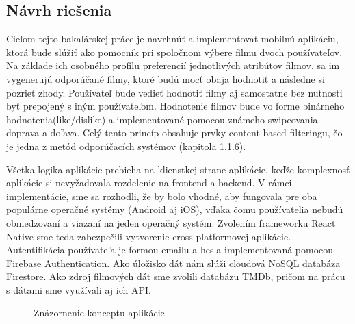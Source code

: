 \subsection{Návrh riešenia}
Cieľom tejto bakalárskej práce je navrhnúť a implementovať mobilnú aplikáciu, 
ktorá bude slúžiť ako pomocník pri spoločnom výbere filmu dvoch používateľov. Na základe ich osobného profilu preferencií jednotlivých atribútov filmov, sa im vygenerujú odporúčané filmy, ktoré budú mocť obaja hodnotiť a následne si pozrieť zhody. Používateľ bude vedieť hodnotiť filmy aj samostatne bez nutnosti byť prepojený s iným používateľom. Hodnotenie filmov bude vo forme binárneho hodnotenia(like/dislike) a implementované pomocou známeho swipeovania doprava a doľava. Celý tento princíp obsahuje prvky content based filteringu, čo je jedna z metód odporúčacích systémov \hyperref[sec:contentbased]{(kapitola 1.1.6).}

Všetka logika aplikácie prebieha na klienstkej strane aplikácie, keďže komplexnosť aplikácie si nevyžadovala rozdelenie na frontend a backend. V rámci implementácie, sme sa rozhodli, že by bolo vhodné, aby fungovala pre oba populárne operačné systémy (Android aj iOS), vďaka čomu používatelia nebudú obmedzovaní a viazaní na jeden operačný systém. Zvolením frameworku React Native sme teda zabezpečili vytvorenie cross platformovej aplikácie. Autentifikácia používateľa je formou emailu a hesla implementovaná pomocou Firebase Authentication. Ako úložisko dát nám slúži cloudová NoSQL databáza Firestore. Ako zdroj filmových dát sme zvolili databázu TMDb, pričom na prácu s dátami sme využívali aj ich API. 
\vspace{55mm} %

\begin{figure}[hbt!]
  \centering  
  \def\stackalignment{c}
           {\scriptsize}
	\caption{Znázornenie konceptu aplikácie}  
  \label{app-diagram}
\end{figure}


